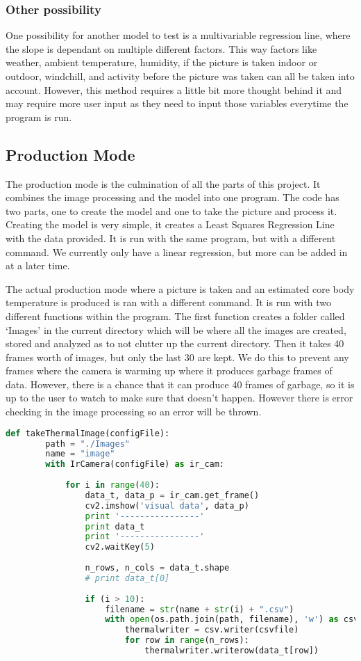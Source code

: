 \subsubsection*{Other possibility}
	One possibility for another model to test is a multivariable regression line, where the slope is dependant on multiple different factors. This way factors like weather, ambient temperature, humidity, if the picture is taken indoor or outdoor, windchill, and activity before the picture was taken can all be taken into account. However, this method requires a little bit more thought behind it and may require more user input as they need to input those variables everytime the program is run. 
	

\subsection*{Production Mode}
	The production mode is the culmination of all the parts of this project. It combines the image processing and the model into one program. The code has two parts, one to create the model and one to take the picture and process it. Creating the model is very simple, it creates a Least Squares Regression Line with the data provided. It is run with the same program, but with a different command. We currently only have a linear regression, but more can be added in at a later time. 
	
	
	The actual production mode where a picture is taken and an estimated core body temperature is produced is ran with a different command. It is run with two different functions within the program. The first function creates a folder called ‘Images’ in the current directory which will be where all the images are created, stored and analyzed as to not clutter up the current directory. Then it takes 40 frames worth of images, but only the last 30 are kept. We do this to prevent any frames where the camera is warming up where it produces garbage frames of data. However, there is a chance that it can produce 40 frames of garbage, so it is up to the user to watch to make sure that doesn’t happen. However there is error checking in the image processing so an error will be thrown.
	
	\begin{lstlisting}[language=Python, caption=Prodiction Mode]
	def takeThermalImage(configFile):
		path = "./Images"
		name = "image"
		with IrCamera(configFile) as ir_cam:
		
			for i in range(40):
				data_t, data_p = ir_cam.get_frame()
				cv2.imshow('visual data', data_p)
				print '----------------'
				print data_t
				print '----------------'
				cv2.waitKey(5)
				
				n_rows, n_cols = data_t.shape
				# print data_t[0]
				
				if (i > 10):
					filename = str(name + str(i) + ".csv")
					with open(os.path.join(path, filename), 'w') as csvfile:
						thermalwriter = csv.writer(csvfile)
						for row in range(n_rows):
							thermalwriter.writerow(data_t[row]) 
	\end{lstlisting}
	
